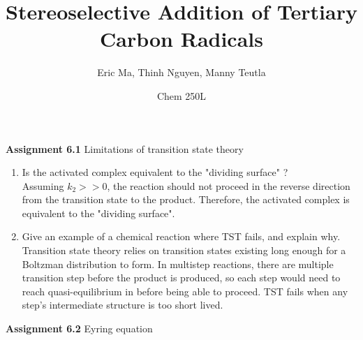 \documentclass{article}
\title{Stereoselective Addition of Tertiary Carbon Radicals}
\author{Eric Ma, Thinh Nguyen, Manny Teutla}
\date{Chem 250L}
\begin{document}
\maketitle

\textbf{Assignment 6.1}
Limitations of transition state theory
\begin{enumerate}
	\item Is the activated complex equivalent to the "dividing surface" ? \\
	Assuming $k_2 >> 0$, the reaction should not proceed in the reverse direction from the transition state to the product.
	Therefore, the activated complex is equivalent to the "dividing surface".

	\item Give an example of a chemical reaction where TST fails, and explain why. \\
	Transition state theory relies on transition states existing long enough for a Boltzman distribution to form.
	In multistep reactions, there are multiple transition step before the product is produced, so each step would need to reach quasi-equilibrium in before being able to proceed.
	TST fails when any step's intermediate structure is too short lived.
\end{enumerate}

\textbf{Assignment 6.2}
Eyring equation
\end{document}
